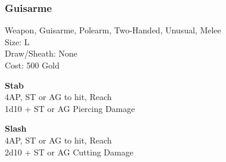 \subsubsection{Guisarme}\label{weapon:guisarme}
Weapon, Guisarme, Polearm, Two-Handed, Unusual, Melee\\
Size: L\\
Draw/Sheath: None\\
Cost: 500 Gold

\textbf{Stab}\\
4AP, ST or AG to hit,  Reach\\
1d10 + \texttimes ST or AG Piercing Damage

\textbf{Slash}\\
4AP, ST or AG to hit,  Reach\\
2d10 + \texttimes ST or AG Cutting Damage
